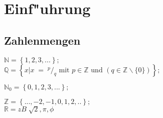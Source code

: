 
\section{Einf"uhrung}
\subsection{Zahlenmengen}
	\begin{minipage}[c]{6.5cm}
		$ \mathbb{N}  = \left\{1,2,3,...\right\};\; $\\
		$ \mathbb{Q} = \left\{x|x \;=\; ^{p}/_{q} \text{ mit } p \in \mathbb{Z}
		\text{ und } (q \in \mathbb{Z} \smallsetminus \{0\})\right\};\;$
	\end{minipage}
	\begin{minipage}[c]{5cm}
		$ \mathbb{N}_0  = \left\{0,1,2,3,...\right\};\; $\\
	\end{minipage}
	\begin{minipage}[c]{5cm}
		$ \mathbb{Z} = \left\{...,-2,-1,0,1,2,..\right\}; $\\
		$ \mathbb{R} = zB \; \sqrt{2}, \pi,\phi$
	\end{minipage}

